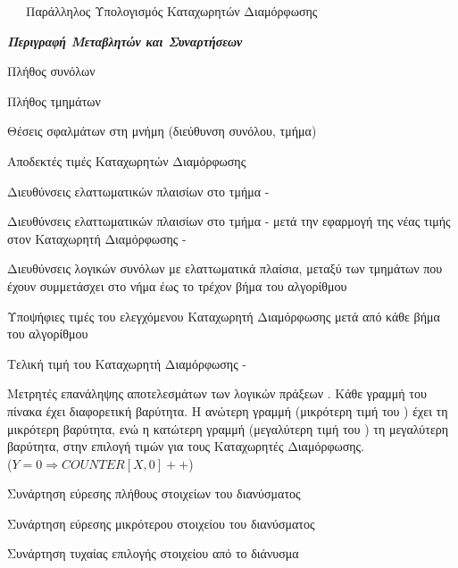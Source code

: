 \begin{algorithm}[H]
    \captionsetup{}
    \caption{\ \ \ Παράλληλος Υπολογισμός Καταχωρητών Διαμόρφωσης}
    \label{alg:parallel}
    \begin{algorithmic}[1]
        \begin{footnotesize}
            \Statex 
            
            \Statex 
            \begin{center}
                \textit{\textbf{Περιγραφή Μεταβλητών και Συναρτήσεων}}
            \end{center}
            
            \Statex
            \begin{description}[leftmargin=9em,style=nextline]
                \item [$SetsNumber$] Πλήθος συνόλων
                \item [$WaysNumber$] Πλήθος τμημάτων
                \item [$FaultMaps$] Θέσεις σφαλμάτων στη μνήμη (διεύθυνση συνόλου, τμήμα)
                \item [$S$] Αποδεκτές τιμές Καταχωρητών Διαμόρφωσης
                \item [$FB_{w}$] Διευθύνσεις ελαττωματικών πλαισίων στο τμήμα - 
                \item [$XFB_{w}$] Διευθύνσεις ελαττωματικών πλαισίων στο τμήμα -  μετά την εφαρμογή της νέας τιμής στον Καταχωρητή Διαμόρφωσης - 
                \item [$FS_{[t,k]}$] Διευθύνσεις λογικών συνόλων με  ελαττωματικά πλαίσια, μεταξύ των τμημάτων που έχουν συμμετάσχει στο νήμα  έως το τρέχον βήμα του αλγορίθμου
                \item [$CCR$] Υποψήφιες τιμές του ελεγχόμενου Καταχωρητή Διαμόρφωσης μετά από κάθε βήμα του αλγορίθμου
                \item [$CR_{w}$] Τελική τιμή του Καταχωρητή Διαμόρφωσης - 
                \item [$COUNTER{[X,Y]}$] Μετρητές επανάληψης αποτελεσμάτων  των λογικών πράξεων \xor. Κάθε γραμμή του πίνακα έχει διαφορετική βαρύτητα. Η ανώτερη γραμμή (μικρότερη τιμή του ) έχει τη μικρότερη βαρύτητα, ενώ η κατώτερη γραμμή (μεγαλύτερη τιμή του ) τη μεγαλύτερη βαρύτητα, στην επιλογή τιμών για τους Καταχωρητές Διαμόρφωσης.\\
                ($Y=0 \Rightarrow COUNTER[X,0]++$)
                \item[$elements(A)$] Συνάρτηση εύρεσης πλήθους στοιχείων του διανύσματος 
                \item[$minimum(A)$] Συνάρτηση εύρεσης μικρότερου στοιχείου του διανύσματος 
                \item[$random(A)$] Συνάρτηση τυχαίας επιλογής στοιχείου από το διάνυσμα 
            \end{description}
            

\end{footnotesize}
\end{algorithmic}
\end{algorithm}
